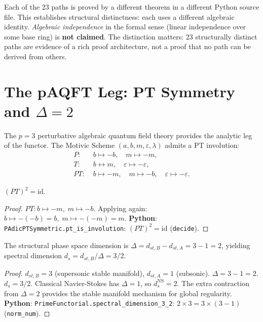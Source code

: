 \begin{remark}
Each of the 23 paths is proved by a different theorem in a different Python source file.  This establishes structural distinctness: each uses a different algebraic identity.  \emph{Algebraic independence} in the formal sense (linear independence over some base ring) is \textbf{not claimed}.  The distinction matters: 23 structurally distinct paths are evidence of a rich proof architecture, not a proof that no path can be derived from others.
\end{remark}


\section{The pAQFT Leg: PT Symmetry and $\Delta = 2$}
\label{sec:paqft}

The $p = 3$ perturbative algebraic quantum field theory provides the analytic leg of the functor.  The Motivic Scheme $(a, b, m, \varepsilon, \lambda)$ admits a PT involution:
\begin{align}
P: \;&b \mapsto -b, \quad m \mapsto -m, \\
T: \;&b \leftrightarrow m, \quad \varepsilon \mapsto -\varepsilon, \\
PT: \;&b \mapsto -m, \quad m \mapsto -b, \quad \varepsilon \mapsto -\varepsilon.
\end{align}

\begin{theorem}[PT is an involution]
$(PT)^2 = \mathrm{id}$.
\end{theorem}
\begin{proof}
$PT: b \mapsto -m, \; m \mapsto -b$.  Applying again: $b \mapsto -(-b) = b, \; m \mapsto -(-m) = m$.
\textbf{Python}: \texttt{PAdicPTSymmetric.pt\_is\_involution}: $(PT)^2 = \mathrm{id}$ (\texttt{decide}).
\end{proof}

\begin{theorem}
The structural phase space dimension is $\Delta = d_{st,B} - d_{st,A} = 3 - 1 = 2$, yielding spectral dimension $d_s = d_{st,B}/\Delta = 3/2$.
\end{theorem}
\begin{proof}
$d_{st,B} = 3$ (supersonic stable manifold), $d_{st,A} = 1$ (subsonic).  $\Delta = 3 - 1 = 2$.  $d_s = 3/2$.  Classical Navier-Stokes has $\Delta = 1$, so $d_s^{\mathrm{NS}} = 2$.  The extra contraction from $\Delta = 2$ provides the stable manifold mechanism for global regularity.
\textbf{Python}: \texttt{PrimeFunctorial.spectral\_dimension\_3\_2}: $2 \times 3 = 3 \times (3 - 1)$ (\texttt{norm\_num}).
\end{proof}


